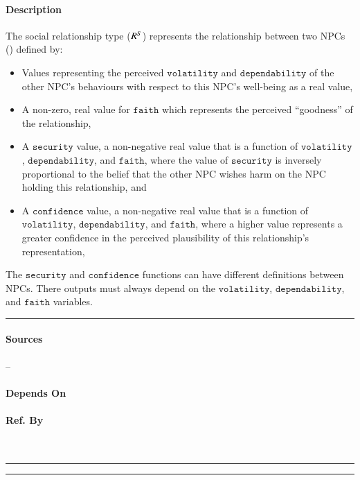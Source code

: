 \paragraph{Description} The social relationship type (${R^{S}}$)
represents the relationship between two NPCs () defined by:
\begin{itemize}
    \item Values representing the perceived $\mathtt{volatility}$ and
    $\mathtt{dependability}$ of the other NPC's behaviours with respect to this
    NPC's well-being as a real value,

    \item A non-zero, real value for $\mathtt{faith}$ which represents the
    perceived ``goodness'' of the relationship,

    \item A $\mathtt{security}$ value, a non-negative real value that is a
    function of $\mathtt{volatility}$, $\mathtt{dependability}$, and
    $\mathtt{faith}$, where the value of $\mathtt{security}$ is inversely
    proportional to the belief that the other NPC wishes harm on the NPC
    holding this relationship, and

    \item A $\mathtt{confidence}$ value, a non-negative real value that is a
    function of $\mathtt{volatility}$, $\mathtt{dependability}$, and
    $\mathtt{faith}$, where a higher value represents a greater confidence
    in the perceived plausibility of this relationship's representation,
\end{itemize}

The $\mathtt{security}$ and $\mathtt{confidence}$ functions can have different
definitions between NPCs. There outputs must always depend on the
$\mathtt{volatility}$, $\mathtt{dependability}$, and $\mathtt{faith}$
variables. \\\hrule

\paragraph{Sources} --

\paragraph{Depends On} 

\paragraph{Ref. By}  \\\hrule\vspace{0.5mm}\hrule
